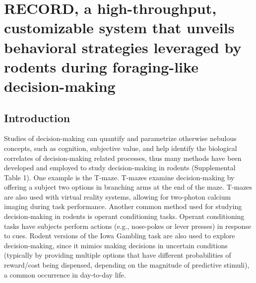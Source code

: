 \documentclass{article}
\newcounter{suppfig}
\renewcommand{\thesuppfig}{S\arabic{suppfig}}  %
\newenvironment{suppfigure}[1][htbp]
  {\refstepcounter{suppfig}%
   \begin{figure}[#1]%
   \renewcommand{\thefigure}{\thesuppfig}}%
  {\end{figure}}
\begin{document}
\begin{suppfigure}
  \label{fig:Alcohol_SI_4}
\end{suppfigure}

\clearpage






\section{RECORD, a high-throughput, customizable system that unveils behavioral strategies leveraged by rodents during foraging-like decision-making}

\subsection{Introduction}
Studies of decision-making can quantify and parametrize otherwise nebulous concepts, such as cognition\cite{shadlen2013decision}, subjective value\cite{glimcher2013neuroeconomics}, and help identify the
biological correlates of decision-making related processes\cite{friedman2015corticostriatal, amemori2021causal, johnson2007neural, xiang2019behavioral, kira2023distributed}, thus many methods have been developed and employed to study decision-making in
rodents (Supplemental Table 1). One example is the T-maze. T-mazes examine decision-making by offering a subject two options in branching arms at the end of the maze\cite{friedman2015corticostriatal, johnson2007neural, xiang2019behavioral, d2021apparatus}. T-mazes are also used with virtual reality systems, allowing for two-photon calcium imaging during task performance\cite{kira2023distributed}. Another common method used for studying decision-making in rodents is operant conditioning tasks\cite{de2023freibox}. Operant conditioning tasks have subjects perform actions (e.g., nose-pokes\cite{kapanaiah2021low, vassilev2022custom} or lever presses\cite{vollmer2021novel}) in response to cues. Rodent versions of the Iowa Gambling task are also used to explore decision-making, since it mimics making decisions in uncertain conditions (typically by providing multiple options that have different probabilities of reward/cost being dispensed, depending on the magnitude of predictive stimuli), a common occurrence in day-to-day life\cite{de2011rodent}.

\vspace{1em}
\end{document}
